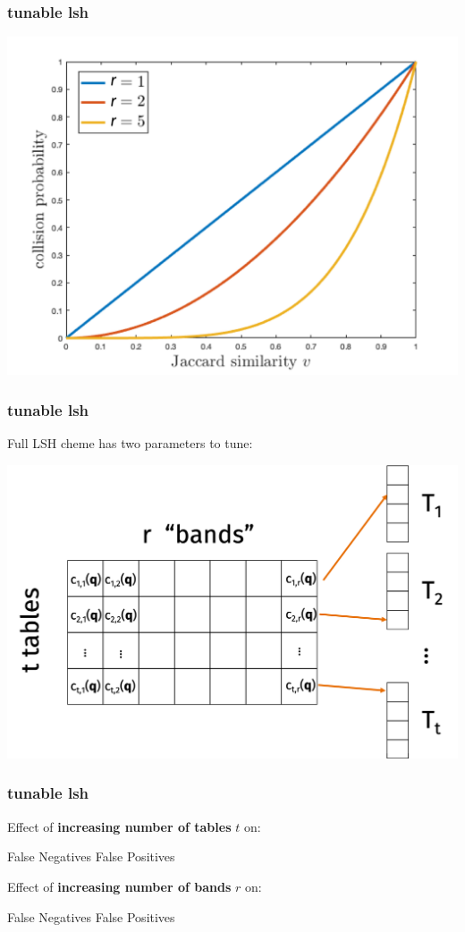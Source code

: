 \documentclass[compress]{beamer}
\begin{document}
\begin{frame}[t]
	\frametitle{tunable lsh}
	\begin{center}
		\includegraphics[width=.8\textwidth]{tuning_minhash.png}
	\end{center}
\end{frame}

\begin{frame}[t]
	\frametitle{tunable lsh}
	Full LSH cheme has two parameters to tune:
	\begin{center}
		\includegraphics[width=.8\textwidth]{full_scheme.png}
	\end{center}
\end{frame}

\begin{frame}[t]
	\frametitle{tunable lsh}
	Effect of \textbf{increasing number of tables} $t$ on:
	\begin{center}
		False Negatives \hspace{6em} False Positives
	\end{center}
\vspace{4em}
	Effect of \textbf{increasing number of bands} $r$ on:
\begin{center}
	False Negatives \hspace{6em} False Positives
\end{center}
\end{frame}
\end{document}
